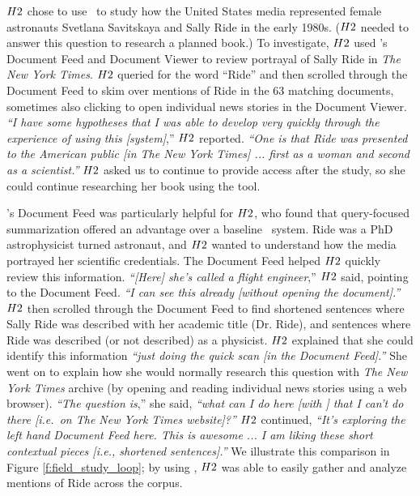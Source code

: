 ${H2}$ chose to use \ours~to study how the United States media represented female astronauts Svetlana Savitskaya and Sally Ride in the early 1980s.
(${H2}$ needed to answer this question to research a planned book.) 
To investigate, $H2$ used \ours's Document Feed and Document Viewer to review portrayal of Sally Ride in \textit{The New York Times}.
$H2$ queried for the word {``Ride''} and then scrolled through the Document Feed to skim over mentions of Ride in the 63 matching documents, sometimes also clicking to open individual news stories in the Document Viewer. 
\textit{``I have some hypotheses that I was able to develop very quickly through the experience of using this [system]},'' $H2$ reported. 
\textit{``One is that Ride was presented to the American public [in The New York Times] ... first as a woman and second as a scientist.''}
$H2$ asked us to continue to provide access after the study, so she could {continue researching her book using the tool}.
 
\ours's Document Feed was particularly helpful for $H2$, who found that query-focused summarization offered an advantage over a baseline \Baselongname~system.
Ride was a PhD astrophysicist turned astronaut, and $H2$ wanted to understand how the media portrayed her scientific credentials.
The Document Feed helped $H2$ quickly review this information. 
\textit{``[Here] she's called a flight engineer},'' $H2$ said, pointing to the Document Feed. \textit{``I can see this already [without opening the document].''}  
$H2$ then scrolled through the Document Feed to find shortened sentences where Sally Ride was described with her academic title (Dr. Ride), and sentences where Ride was described (or not described) as a physicist. $H2$ explained that she could identify this information \textit{``just doing the quick scan [in the Document Feed].''} 
She went on to explain how she would normally research this question with \textit{The New York Times} archive (by opening and reading individual news stories using a web browser). 
\textit{``The question is},'' she said, {\textit{``what can I do here [with \ours] that I can't do there [i.e.\ on \textit{The New York Times website]?''}}}
$H2$ continued, \textit{``It's exploring the left hand Document Feed here. This is awesome ... I am liking these short contextual pieces [i.e., shortened sentences].''}
We illustrate this comparison in Figure \ref{f:field_study_loop}; 
by using \ours, $H2$ was able to easily gather and analyze mentions of Ride across the corpus. 